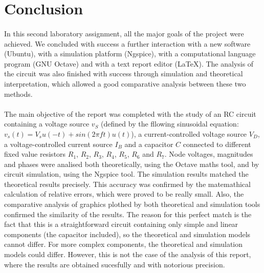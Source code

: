 \section{Conclusion}
\label{sec:conclusion}

\paragraph{}
In this second laboratory assignment, all the major goals of the project were achieved. We concluded with success a further interaction with a new software (Ubuntu), with a simulation platform (Ngspice), with a computational language program (GNU Octave) and with a text report editor (LaTeX). The analysis of the circuit was also finished with success through simulation and theoretical interpretation, which allowed a good comparative analysis between these two methods.

\paragraph{}
The main objective of the report was completed with the study of an RC circuit containing a voltage source $v_S$ (defined by the fllowing sinusoidal equation: $v_s (t) = V_s u(−t) + sin(2 \pi ft)u(t) $), a current-controlled voltage source $V_D$, a voltage-controlled current source $I_B$ and a capacitor $C$ connected to different fixed value resistors $R_1$, $R_2$, $R_3$, $R_4$, $R_5$, $R_6$ and $R_7$. Node voltages, magnitudes and phases were analised both theoretically, using the Octave maths tool, and by circuit simulation, using the Ngspice tool. The simulation results matched the theoretical results precisely. This accuracy was confirmed by the matemathical calculation of relative errors, which were proved to be really small. Also, the comparative analysis of graphics plothed by both theoretical and simulation tools confirmed the similarity of the results. The reason for this perfect match is the fact that this is a straightforward circuit containing only simple and linear components (the capacitor included), so the theoretical and simulation models cannot differ. For more complex components, the theoretical and simulation models could differ. However, this is not the case of the analysis of this report, where the results are obtained sucesfully and with notorious precision.
